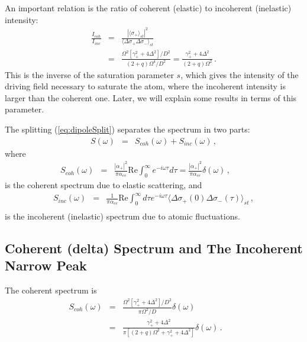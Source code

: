 \documentclass[twocolumn,aps,eqsecnum,showkeys,amsmath]{revtex4-2}
\begin{document}
An important relation is the ratio of coherent (elastic) to incoherent 
(inelastic) intensity: 
%
\begin{eqnarray} 
\frac{I_{coh}}{I_{inc}} &=& \frac{|\langle \sigma_+  \rangle_{st}|^2}
	{\langle \Delta \sigma_+ \Delta \sigma_- \rangle_{st}}		\\ 
&=& \frac{ \Omega^2 [\gamma_+^2 +4\Delta^2]/D^2 }
	{(2+q) \Omega^4 /D^2} 
	= \frac{ \gamma_+^2 +4\Delta^2 }{(2+q) \Omega^2}  \,. 
	\nonumber 
\end{eqnarray}
This is the inverse of the saturation parameter $s$, which gives the 
intensity of the driving field necessary to saturate the atom, where 
the incoherent intensity is larger than the coherent one. Later, we will 
explain some results in terms of this parameter.

The splitting (\ref{eq:dipoleSplit}) separates the spectrum in two parts: 
%
\begin{eqnarray} 	\label{eq:3LASpectrum?}
S(\omega) &=& S_{coh}(\omega) +S_{inc}(\omega) 	\,,
\end{eqnarray}
where 
%
\begin{eqnarray}
S_{coh}(\omega) &=& \frac{|\alpha_+ |^2}{ \pi \alpha_{ee}  }
	\mathrm{Re} \int_0^{\infty}  e^{-i \omega \tau} d\tau 
	= \frac{|\alpha_+ |^2}{ \pi \alpha_{ee}  } 
	\delta(\omega)	\,, 	\qquad 
\end{eqnarray}
is the coherent spectrum due to elastic scattering, and 
%
\begin{eqnarray} 	\label{eq:Sinc}
S_{inc}(\omega) 
&=& \frac{1}{ \pi \alpha_{ee}  } \mathrm{Re} \int_0^{\infty} 
	d\tau e^{-i \omega \tau} 
	\langle \Delta \sigma_+(0) \Delta \sigma_-(\tau) \rangle_{st} 
	\,, 	\nonumber \\
\end{eqnarray}
is the incoherent (inelastic) spectrum due to atomic fluctuations.  

\subsection{Coherent (delta) Spectrum and The Incoherent Narrow Peak}
The coherent spectrum is 
%
\begin{eqnarray} 	\label{eq:SCoh3LA}
S_{coh}(\omega) 
&=& \frac{ \Omega^2[\gamma_+^2 +4\Delta^2]/D^2 }
    {\pi \Omega^2/D} \delta(\omega)	  \nonumber    \\
   &=& \frac{ \gamma_+^2 +4\Delta^2 }
    {\pi [(2+q)\Omega^2 +\gamma_+^2 +4\Delta^2 ] } \delta(\omega)	 \,. 
    \qquad 
\end{eqnarray}
\end{document}
